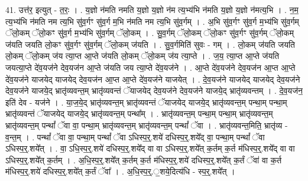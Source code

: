 \documentclass[17pt]{extarticle}
\begin{document}
41. उत्त॑र॒ इत्युत् - त॒रः॒ । . य॒ज्ञो न॑मति नमति य॒ज्ञो य॒ज्ञो न॑म त्य॒भ्य॑भि न॑मति य॒ज्ञो य॒ज्ञो न॑मत्य॒भि । . न॒म॒ त्य॒भ्य॑भि न॑मति नम त्य॒भि सु॑व॒र्गꣳ सु॑व॒र्ग म॒भि न॑मति नम त्य॒भि सु॑व॒र्गम् । . अ॒भि सु॑व॒र्गꣳ सु॑व॒र्ग म॒भ्य॑भि सु॑व॒र्गम् ॅलो॒कम् ॅलो॒कꣳ सु॑व॒र्ग म॒भ्य॑भि सु॑व॒र्गम् ॅलो॒कम् । . सु॒व॒र्गम् ॅलो॒कम् ॅलो॒कꣳ सु॑व॒र्गꣳ सु॑व॒र्गम् ॅलो॒कम् ज॑यति जयति लो॒कꣳ सु॑व॒र्गꣳ सु॑व॒र्गम् ॅलो॒कम् ज॑यति । . सु॒व॒र्गमिति॑ सुवः - गम् । . लो॒कम् ज॑यति जयति लो॒कम् ॅलो॒कम् ज॑य त्या॒प्त आ॒प्ते ज॑यति लो॒कम् ॅलो॒कम् ज॑य त्या॒प्ते । . ज॒य॒ त्या॒प्त आ॒प्ते ज॑यति जयत्या॒प्ते दे॑व॒यज॑ने देव॒यज॑न आ॒प्ते ज॑यति जय त्या॒प्ते दे॑व॒यज॑ने । . आ॒प्ते दे॑व॒यज॑ने देव॒यज॑न आ॒प्त आ॒प्ते दे॑व॒यज॑ने याजयेद् याजयेद् देव॒यज॑न आ॒प्त आ॒प्ते दे॑व॒यज॑ने याजयेत् । . दे॒व॒यज॑ने याजयेद् याजयेद् देव॒यज॑ने देव॒यज॑ने याजये॒द् भ्रातृ॑व्यवन्त॒म् भ्रातृ॑व्यवन्तं ॅयाजयेद् देव॒यज॑ने देव॒यज॑ने याजये॒द् भ्रातृ॑व्यवन्तम् । . दे॒व॒यज॑न॒ इति॑ देव - यज॑ने । . या॒ज॒ये॒द् भ्रातृ॑व्यवन्त॒म् भ्रातृ॑व्यवन्तं ॅयाजयेद् याजये॒द् भ्रातृ॑व्यवन्त॒म् पन्था॒म् पन्था॒म् भ्रातृ॑व्यवन्तं ॅयाजयेद् याजये॒द् भ्रातृ॑व्यवन्त॒म् पन्था᳚म् । . भ्रातृ॑व्यवन्त॒म् पन्था॒म् पन्था॒म् भ्रातृ॑व्यवन्त॒म् भ्रातृ॑व्यवन्त॒म् पन्थां᳚ ॅवा वा॒ पन्था॒म् भ्रातृ॑व्यवन्त॒म् भ्रातृ॑व्यवन्त॒म् पन्थां᳚ ॅवा । . भ्रातृ॑व्यवन्त॒मिति॒ भ्रातृ॑व्य - व॒न्त॒म् । . पन्थां᳚ ॅवा वा॒ पन्था॒म् पन्थां᳚ ॅवा ऽधिस्प॒र्॒.शये॑ दधिस्प॒र्॒.शये᳚द् वा॒ पन्था॒म् पन्थां᳚ ॅवा ऽधिस्प॒र्॒.शये᳚त् । . वा॒ ऽधि॒स्प॒र्॒.शये॑ दधिस्प॒र्॒.शये᳚द् वा वा ऽधिस्प॒र्॒.शये᳚त् क॒र्तम् क॒र्त म॑धिस्प॒र्॒.शये᳚द् वा वा ऽधिस्प॒र्॒.शये᳚त् क॒र्तम् । . अ॒धि॒स्प॒र्॒.शये᳚त् क॒र्तम् क॒र्त म॑धिस्प॒र्॒.शये॑ दधिस्प॒र्॒.शये᳚त् क॒र्तं ॅवा॑ वा क॒र्त म॑धिस्प॒र्॒.शये॑ दधिस्प॒र्॒.शये᳚त् क॒र्तं ॅवा᳚ । . अ॒धि॒स्प॒र्॒.॒शये॒दित्य॑धि - स्प॒र्॒.शये᳚त् । \newline
\end{document}
